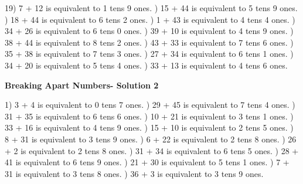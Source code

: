 \documentclass{article}%
\begin{document}
19) 7 + 12 is equivalent to 1 tens 9 ones.%
) 15 + 44 is equivalent to 5 tens 9 ones.%
) 18 + 44 is equivalent to 6 tens 2 ones.%
) 1 + 43 is equivalent to 4 tens 4 ones.%
) 34 + 26 is equivalent to 6 tens 0 ones.%
) 39 + 10 is equivalent to 4 tens 9 ones.%
) 38 + 44 is equivalent to 8 tens 2 ones.%
) 43 + 33 is equivalent to 7 tens 6 ones.%
) 35 + 38 is equivalent to 7 tens 3 ones.%
) 27 + 34 is equivalent to 6 tens 1 ones.%
) 34 + 20 is equivalent to 5 tens 4 ones.%
) 33 + 13 is equivalent to 4 tens 6 ones.%
\newline%
\newpage%
\large%
\begin{center}%
\textbf{Breaking Apart Numbers- Solution 2}%
\newline%
\end{center} \normalsize%
1) 3 + 4 is equivalent to 0 tens 7 ones.%
) 29 + 45 is equivalent to 7 tens 4 ones.%
) 31 + 35 is equivalent to 6 tens 6 ones.%
) 10 + 21 is equivalent to 3 tens 1 ones.%
) 33 + 16 is equivalent to 4 tens 9 ones.%
) 15 + 10 is equivalent to 2 tens 5 ones.%
) 8 + 31 is equivalent to 3 tens 9 ones.%
) 6 + 22 is equivalent to 2 tens 8 ones.%
) 26 + 2 is equivalent to 2 tens 8 ones.%
) 31 + 34 is equivalent to 6 tens 5 ones.%
) 28 + 41 is equivalent to 6 tens 9 ones.%
) 21 + 30 is equivalent to 5 tens 1 ones.%
) 7 + 31 is equivalent to 3 tens 8 ones.%
) 36 + 3 is equivalent to 3 tens 9 ones.%
\end{document}

